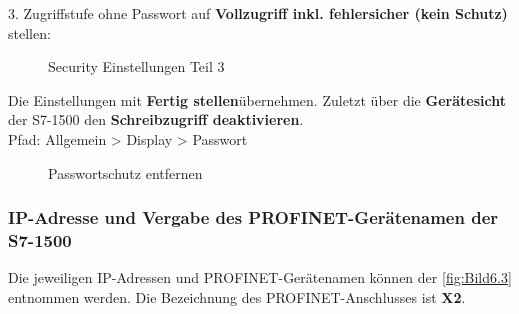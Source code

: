 \clearpage

3. Zugriffstufe ohne Passwort auf \textbf{Vollzugriff inkl. fehlersicher (kein Schutz)} stellen:
\begin{figure}[H]
   \centering
   \caption[Security Einstellungen Teil 3]{Security Einstellungen Teil 3}
   \label{fig:Bild6.15}
\end{figure}

Die Einstellungen mit \glqq\textbf{Fertig stellen}\grqq\:übernehmen. Zuletzt über die \textbf{Gerätesicht} der S7-1500 den \textbf{Schreibzugriff deaktivieren}.\\
Pfad: Allgemein > Display > Passwort 
\begin{figure}[H]
   \centering
   \caption[Passwortschutz entfernen]{Passwortschutz entfernen}
   \label{fig:Bild6.16}
\end{figure}

\clearpage

\subsubsection{IP-Adresse und Vergabe des PROFINET-Gerätenamen der S7-1500} \label{sec: IP-Adresse_PROFINET-Gerätename_S7-1500}
Die jeweiligen IP-Adressen und PROFINET-Gerätenamen können der \autoref{fig:Bild6.3} entnommen werden. Die Bezeichnung des PROFINET-Anschlusses ist \textbf{X2}.

